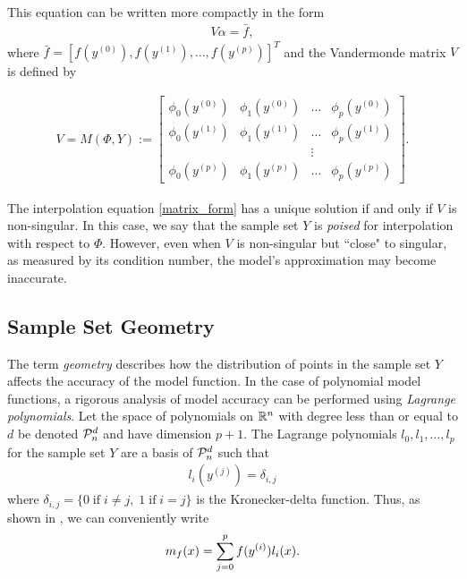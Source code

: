 \documentclass{article}
\begin{document}
This equation can be written more compactly in the form
\begin{align}
\label{matrix_form}
V \alpha = \bar{f},
\end{align}
where $\bar{f} = [f(y^{(0)}), f(y^{(1)}), \ldots, f(y^{(p)})]^T$ and the Vandermonde matrix $V$ is defined by 

\begin{align}
\label{vandermonde}
V=M(\Phi,Y) :=
\begin{bmatrix}
    \phi_0(y^{(0)})      & \phi_1(y^{(0)})       & \ldots & \phi_{p}(y^{(0)})      \\
    \phi_0(y^{(1)})      & \phi_1(y^{(1)})       & \dots  & \phi_{p}(y^{(1)})      \\
                     &                   & \vdots &                    \\
    \phi_0(y^{(p)})    & \phi_1(y^{(p)})     & \ldots & \phi_{p}(y^{{(p)}})
\end{bmatrix}.
\end{align}


The interpolation equation \cref{matrix_form} has a unique solution if and only if $V$ is non-singular.
In this case, we say that the sample set $Y$ is \emph{poised} for interpolation with respect to $\Phi$. 
However, even when $V$ is non-singular but ``close" to singular, as measured by its condition number, 
the model's approximation may become inaccurate.


\subsection{Sample Set Geometry}

\label{geometry}
The term \emph{geometry} describes how the distribution of points in the sample set $Y$ affects the accuracy of the model function.       In the case of polynomial model functions, a rigorous analysis of model accuracy can be performed using \emph{Lagrange polynomials}.
Let the space of polynomials on $\mathbb R^n$ with degree less than or equal to $d$ be denoted $\mathcal{P}^d_n$ and have dimension $p+1$.
The Lagrange polynomials $l_0, l_1, \ldots, l_p$ for the sample set $Y$ are a basis of $\mathcal{P}^d_n$ such that
\begin{align}
l_i(y^{(j)}) = \delta_{i,j}
\end{align}
where $\delta_{i,j} = \{0 \;\text{if}\; i\ne j,\; 1 \;\text{if} \; i = j \}$ is the Kronecker-delta function.
Thus, as shown in \cite{introduction_book}, we can conveniently write
\begin{align}
\label{reg}
{{m}_f}(x) = \sum^p_{j=0}f(y^{(i)})l_i(x).
\end{align}
\end{document}
